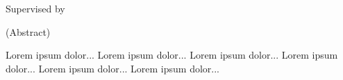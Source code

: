 \cleardoublepage
\thispagestyle{empty}
\doublespacing
\begin{center}
    \ifpdftex 
        {\fontsize{16}{19.2}\selectfont \textbf{\@title}}\\[1.5cm]
    \else 
        {\fontsize{16}{19.2}\selectfont{} \textbf{\@title}}\\[1.5cm]
    \fi 
    {\fontsize{16}{19.2}\selectfont \textbf{\@author}}\\[1.cm]
    {\fontsize{11}{19.2}\selectfont \@department}\\%
    {\fontsize{11}{19.2}\selectfont \@school}\\%
    {\fontsize{11}{19.2}\selectfont Supervised by \@advisor}\\[1.5cm]
\end{center}
(Abstract)

Lorem ipsum dolor... Lorem ipsum dolor... Lorem ipsum dolor... Lorem ipsum dolor... Lorem ipsum dolor... Lorem ipsum dolor...

\restoregeometry
\clearpage